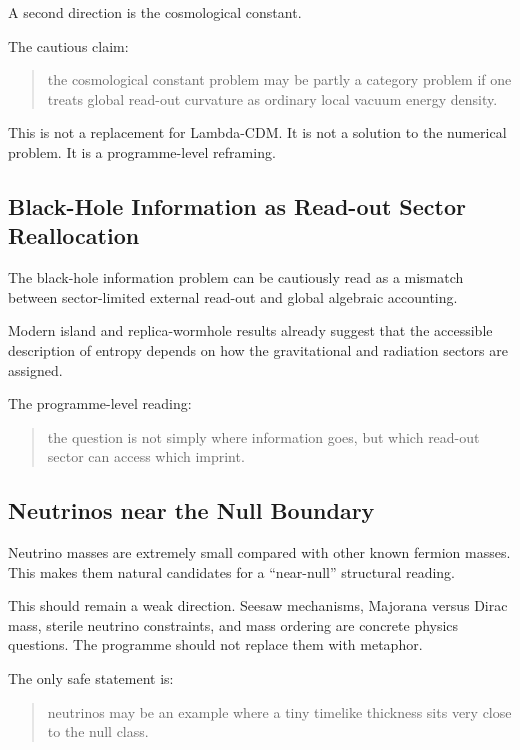 \documentclass[12pt,a4paper]{article}
\theoremstyle{definition}
\theoremstyle{remark}
\begin{document}
A second direction is the cosmological constant.

The cautious claim:

\begin{quote}
the cosmological constant problem may be partly a category problem if
one treats global read-out curvature as ordinary local vacuum energy
density.
\end{quote}

This is not a replacement for Lambda-CDM. It is not a solution to the
numerical problem. It is a programme-level reframing.

\subsection{Black-Hole Information as Read-out Sector
Reallocation}\label{black-hole-information-as-read-out-sector-reallocation}

The black-hole information problem can be cautiously read as a mismatch
between sector-limited external read-out and global algebraic
accounting.

Modern island and replica-wormhole results already suggest that the
accessible description of entropy depends on how the gravitational and
radiation sectors are assigned.

The programme-level reading:

\begin{quote}
the question is not simply where information goes, but which read-out
sector can access which imprint.
\end{quote}

\subsection{Neutrinos near the Null
Boundary}\label{neutrinos-near-the-null-boundary}

Neutrino masses are extremely small compared with other known fermion
masses. This makes them natural candidates for a ``near-null''
structural reading.

This should remain a weak direction. Seesaw mechanisms, Majorana versus
Dirac mass, sterile neutrino constraints, and mass ordering are concrete
physics questions. The programme should not replace them with metaphor.

The only safe statement is:

\begin{quote}
neutrinos may be an example where a tiny timelike thickness sits very
close to the null class.
\end{quote}
\end{document}
